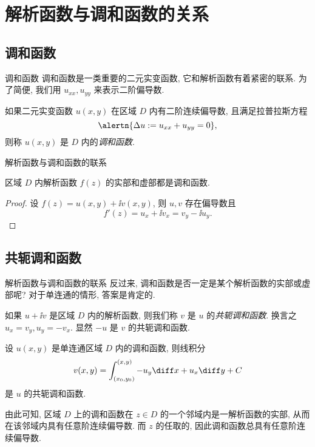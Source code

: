 \section{解析函数与调和函数的关系}


\subsection{调和函数}

\begin{frame}{调和函数}
	\onslide<+->
	调和函数是一类重要的二元实变函数, 它和解析函数有着紧密的联系.
	\onslide<+->
	为了简便, 我们用 $u_{xx},u_{yy}$ 来表示二阶偏导数.

	\onslide<+->
	\begin{definition}
		如果二元实变函数 $u(x,y)$ 在区域 $D$ 内有二阶连续偏导数, 且满足拉普拉斯方程
	\[
		\alertn{\Delta u:=u_{xx}+u_{yy}=0},
	\]
		则称 $u(x,y)$ 是 $D$ 内的\emph{调和函数}.
	\end{definition}
\end{frame}


\begin{frame}{解析函数与调和函数的联系}
	\onslide<+->
	\begin{theorem}
		区域 $D$ 内解析函数 $f(z)$ 的实部和虚部都是调和函数.
	\end{theorem}

	\onslide<+->
	\begin{proof}
		设 $f(z)=u(x,y)+\ii v(x,y)$, 则 $u,v$ 存在偏导数且
			\[f'(z)=u_x+\ii v_x=v_y-\ii u_y.
	\]
		\onslide<+->{可知
			\[\Delta u=u_{xx}+u_{yy}=v_{yx}-v_{xy}=0,\]}
			\vspace{-\baselineskip}
		\onslide<+->{
			\[\Delta v=v_{xx}+v_{yy}=-u_{yx}+u_{xy}=0.\qedhere\]}
		\vspace{-\baselineskip}
	\end{proof}
\end{frame}


\subsection{共轭调和函数}
\begin{frame}{解析函数与调和函数的联系}
	\onslide<+->
	反过来, 调和函数是否一定是某个解析函数的实部或虚部呢?
	\onslide<+->
	对于单连通的情形, 答案是肯定的.

	\onslide<+->
	如果 $u+\ii v$ 是区域 $D$ 内的解析函数, 则我们称 $v$ 是 $u$ 的\emph{共轭调和函数}.
	\onslide<+->
	换言之 $u_x=v_y,u_y=-v_x$.
	\onslide<+->
	显然 $-u$ 是 $v$ 的共轭调和函数.
	\onslide<+->
	\begin{theorem}
		设 $u(x,y)$ 是单连通区域 $D$ 内的调和函数, 则线积分
	\[
		v(x,y)=\int_{(x_0,y_0)}^{(x,y)}-u_y\diff x+u_x\diff y+C
	\]
		是 $u$ 的共轭调和函数.
	\end{theorem}
	\onslide<+->
	由此可知, 区域 $D$ 上的调和函数在 $z\in D$ 的一个邻域内是一解析函数的实部, 从而在该邻域内具有任意阶连续偏导数.
	\onslide<+->
	而 $z$ 的任取的, 因此调和函数总具有任意阶连续偏导数.
\end{frame}


